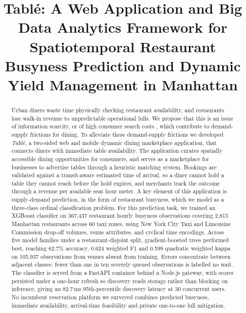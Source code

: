 \documentclass[conference]{IEEEtran}
\begin{document}
\title{Tabl\'{e}: A Web Application and Big Data Analytics Framework for Spatiotemporal Restaurant Busyness Prediction and Dynamic Yield Management in Manhattan}

\author{
}

\maketitle

\begin{abstract}
Urban diners waste time physically checking restaurant availability, and restaurants lose walk-in revenue to unpredictable operational lulls. We propose that this is an issue of information scarcity, or of high consumer search costs \cite{stigler1961economics}, which contribute to demand-supply frictions for dining. To alleviate these demand-supply frictions we developed \textit{Tabl\'{e}}, a two-sided web and mobile dynamic dining marketplace application, that connects diners with immediate table availability. The application curates spatially accessible dining opportunities for consumers, and serves as a marketplace for businesses to advertise tables through a heuristic matching system. Bookings are validated against a transit-aware estimated time of arrival, so a diner cannot hold a table they cannot reach before the hold expires, and merchants track the outcome through a revenue per available seat hour meter. A key element of this application is supply-demand prediction, in the form of restaurant busyness, which we model as a three-class ordinal classification problem. For this prediction task, we trained an XGBoost classifier on 367{,}437 restaurant hourly busyness observations covering 2{,}815 Manhattan restaurants across 60 taxi zones, using New York City Taxi and Limousine Commission drop-off volumes, venue attributes, and cyclical time encodings. Across five model families under a restaurant-disjoint split, gradient-boosted trees performed best, reaching 62.7\% accuracy, 0.624 weighted F1 and 0.599 quadratic weighted kappa on 105{,}937 observations from venues absent from training. Errors concentrate between adjacent classes: fewer than one in ten severely queued observations is labelled no wait. The classifier is served from a FastAPI container behind a Node.js gateway, with scores persisted under a one-hour refresh so discovery reads storage rather than blocking on inference, giving an 82.7\,ms 95th-percentile discovery latency at 30 concurrent users. No incumbent reservation platform we surveyed combines predicted busyness, immediate availability, arrival-time feasibility and private one-to-one lull mitigation.
\end{abstract}
\end{document}
